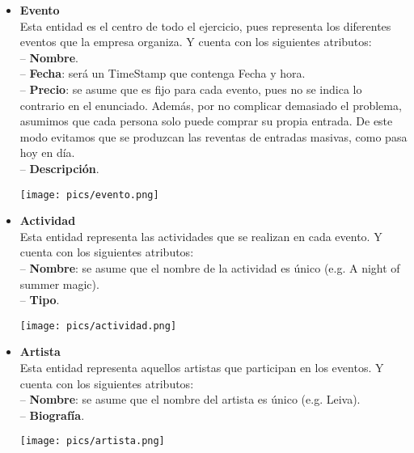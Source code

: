 \documentclass[12pt]{article}
\begin{document}
    \begin{itemize}
        \item \textbf{Evento}\\
            Esta entidad es el centro de todo el ejercicio, pues representa los diferentes eventos que la empresa organiza. 
            Y cuenta con los siguientes atributos: \\
                \hspace{0.5cm} -- {\bfseries Nombre}. \\
                \hspace{0.5cm} -- {\bfseries Fecha}: será un TimeStamp que contenga Fecha y hora. \\
                \hspace{0.5cm} -- {\bfseries Precio}: se asume que es fijo para cada evento, pues no se indica lo contrario en el enunciado. 
                Además, por no complicar demasiado el problema, asumimos que cada persona solo puede comprar su propia entrada. 
                De este modo evitamos que se produzcan las reventas de entradas masivas, como pasa hoy en día. \\
                \hspace{0.5cm} -- {\bfseries Descripción}.
            \begin{center}
            {\texttt{[image: pics/evento.png]}}
            \end{center}

        \item \textbf{Actividad}\\
            Esta entidad representa las actividades que se realizan en cada evento. 
            Y cuenta con los siguientes atributos:\\
                \hspace{0.5cm} -- {\bfseries Nombre}: se asume que el nombre de la actividad es único (e.g. A night of summer magic). \\
                \hspace{0.5cm} -- {\bfseries Tipo}.
            \begin{center}
            {\texttt{[image: pics/actividad.png]}}
            \end{center}

        \item \textbf{Artista}\\
            Esta entidad representa aquellos artistas que participan en los eventos. 
            Y cuenta con los siguientes atributos: \\
                \hspace{0.5cm} -- {\bfseries Nombre}: se asume que el nombre del artista es único (e.g. Leiva). \\
                \hspace{0.5cm} -- {\bfseries Biografía}.
            \begin{center}
            {\texttt{[image: pics/artista.png]}}
            \end{center}


\end{itemize}
\end{document}
